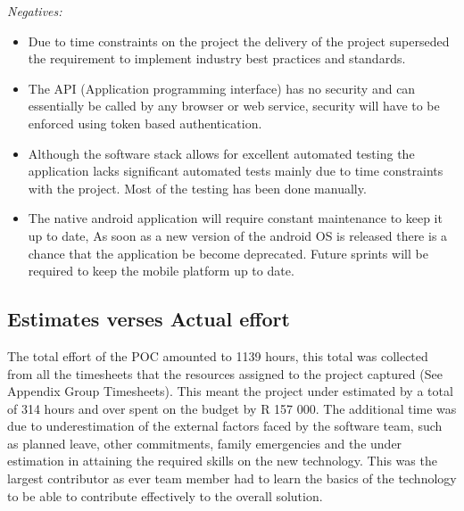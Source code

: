 \documentclass[12pt]{witseiepaper}
\begin{document}
\textit{Negatives:}

\begin{itemize}
\item Due to time constraints on the project the delivery of the project superseded the requirement to implement industry best practices and standards.
\item The API (Application programming interface) has no security and can essentially be called by any browser or web service, security will have to be enforced using token based authentication.
\item Although the software stack allows for excellent automated testing the application lacks significant automated tests mainly due to time constraints with the project. Most of the testing has been done manually.
\item The native android application will require constant maintenance to keep it up to date, As soon as a new version of the android OS is released there is a chance that the application be become deprecated. Future sprints will be required to keep the mobile platform up to date. 
\end{itemize}



\subsection{Estimates verses Actual effort}
The total effort of the POC amounted to 1139 hours, this total was collected from all the timesheets that the resources assigned to the project captured (See Appendix Group Timesheets). This meant the project under estimated by a total of 314 hours and over spent on the budget by R 157 000.  The additional time was due to underestimation of the external factors faced by the software team, such as planned leave, other commitments, family emergencies and the under estimation in attaining the required skills on the new technology. This was the largest contributor as ever team member had to learn the basics of the technology to be able to contribute effectively to the overall solution.
\end{document}

